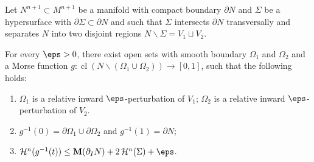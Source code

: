 \begin{lemma}\label{lem:morse-separate}
    Let $N^{n + 1}\subset M^{n + 1}$ be a manifold with compact boundary $\partial N$ and $\Sigma$ be a hypersurface with $\partial\Sigma \subset \partial N$ and such that $\Sigma$ intersects $\partial N$ transversally and separates $N$ into two disjoint regions $N\backslash \Sigma = V_1 \sqcup V_2$.

    For every $\eps > 0$, there exist open sets with smooth boundary $\Omega_1$ and $\Omega_2$ and a Morse function $g: \operatorname{cl}(N\backslash(\Omega_1\cup\Omega_2)) \to [0, 1]$, such that the following holds:
    \begin{enumerate}
        \item[(1)] $\Omega_1$ is a relative inward $\eps$-perturbation of $V_1$; $\Omega_2$ is a relative inward $\eps$-perturbation of $V_2$.
        \item[(2)] $g^{-1}(0) = \partial\Omega_1\cup\partial\Omega_2$ and $g^{-1}(1) = \partial N$;
        \item[(3)] $\mathcal{H}^n(g^{-1}(t)) \leq \mathbf{M}(\partial_I N) + 2\,\mathcal{H}^n(\Sigma) + \eps$.
    \end{enumerate}
\end{lemma}
